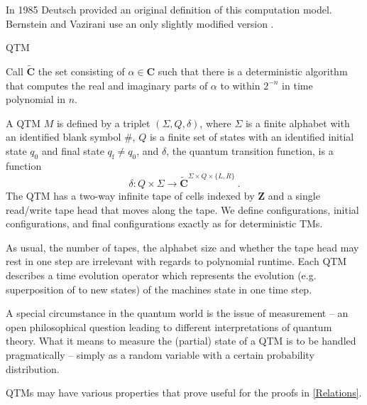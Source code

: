 In 1985 Deutsch \cite{deutsch_1985} provided an original definition of this computation model.
Bernstein and Vazirani use an only slightly modified version \cite{bernstein_vazirani_1997}.

\begin{definition}
\label{def:QTM}
\acl{QTM} \cite{bernstein_vazirani_1997}

Call $\mathbf{\tilde{C}}$ the set consisting of $\alpha\in\mathbf{C}$ such that there is a deterministic algorithm that computes the real and imaginary parts of $\alpha$ to within $2^{-n}$ in time polynomial in $n$.

A \ac{QTM} $M$ is defined by a triplet $(\Sigma, Q, \delta)$, where $\Sigma$ is a finite alphabet with an identified blank symbol $\#$, $Q$ is a finite set of states with an identified initial state $q_0$ and final state $q_\mathrm{f}\neq q_0$, and $\delta$, the quantum transition function, is a function
\begin{equation*}
    \delta
    :Q\times\Sigma
    \rightarrow
    \mathbf{\tilde{C}}^{\Sigma\times Q\times\{L,R\}}
    \ .
\end{equation*}
The \ac{QTM} has a two-way infinite tape of cells indexed by $\mathbf{Z}$ and a single read/write tape head that moves along the tape.
We define configurations, initial configurations, and final configurations exactly as for deterministic \acp{TM}.
\end{definition}

As usual, the number of tapes, the alphabet size and whether the tape head may rest in one step are irrelevant with regards to polynomial runtime.
Each \ac{QTM} describes a time evolution operator which represents the evolution (e.g. superposition of to new states) of the machines state in one time step.

A special circumstance in the quantum world is the issue of measurement -- an open philosophical question leading to different interpretations of quantum theory.
What it means to measure the (partial) state of a \ac{QTM} is to be handled pragmatically -- simply as a random variable with a certain probability distribution.

\acp{QTM} may have various properties that prove useful for the proofs in \cref{Relations}.

